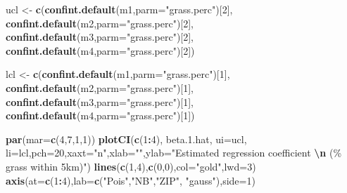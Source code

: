 \documentclass[
]{book}
\newenvironment{Shaded}{\begin{snugshade}}{\end{snugshade}}
\newcommand{\AttributeTok}[1]{\textcolor[rgb]{0.13,0.29,0.53}{#1}}
\newcommand{\DecValTok}[1]{\textcolor[rgb]{0.00,0.00,0.81}{#1}}
\newcommand{\FloatTok}[1]{\textcolor[rgb]{0.00,0.00,0.81}{#1}}
\newcommand{\FunctionTok}[1]{\textcolor[rgb]{0.13,0.29,0.53}{\textbf{#1}}}
\newcommand{\NormalTok}[1]{#1}
\newcommand{\OtherTok}[1]{\textcolor[rgb]{0.56,0.35,0.01}{#1}}
\newcommand{\SpecialCharTok}[1]{\textcolor[rgb]{0.81,0.36,0.00}{\textbf{#1}}}
\newcommand{\StringTok}[1]{\textcolor[rgb]{0.31,0.60,0.02}{#1}}
\begin{document}
\begin{Shaded}
\begin{Highlighting}[]
\NormalTok{ucl }\OtherTok{\textless{}{-}} \FunctionTok{c}\NormalTok{(}\FunctionTok{confint.default}\NormalTok{(m1,}\AttributeTok{parm=}\StringTok{"grass.perc"}\NormalTok{)[}\DecValTok{2}\NormalTok{],}
         \FunctionTok{confint.default}\NormalTok{(m2,}\AttributeTok{parm=}\StringTok{"grass.perc"}\NormalTok{)[}\DecValTok{2}\NormalTok{],}
         \FunctionTok{confint.default}\NormalTok{(m3,}\AttributeTok{parm=}\StringTok{"grass.perc"}\NormalTok{)[}\DecValTok{2}\NormalTok{],}
         \FunctionTok{confint.default}\NormalTok{(m4,}\AttributeTok{parm=}\StringTok{"grass.perc"}\NormalTok{)[}\DecValTok{2}\NormalTok{])}

\NormalTok{lcl }\OtherTok{\textless{}{-}} \FunctionTok{c}\NormalTok{(}\FunctionTok{confint.default}\NormalTok{(m1,}\AttributeTok{parm=}\StringTok{"grass.perc"}\NormalTok{)[}\DecValTok{1}\NormalTok{],}
         \FunctionTok{confint.default}\NormalTok{(m2,}\AttributeTok{parm=}\StringTok{"grass.perc"}\NormalTok{)[}\DecValTok{1}\NormalTok{],}
         \FunctionTok{confint.default}\NormalTok{(m3,}\AttributeTok{parm=}\StringTok{"grass.perc"}\NormalTok{)[}\DecValTok{1}\NormalTok{],}
         \FunctionTok{confint.default}\NormalTok{(m4,}\AttributeTok{parm=}\StringTok{"grass.perc"}\NormalTok{)[}\DecValTok{1}\NormalTok{])}

\FunctionTok{par}\NormalTok{(}\AttributeTok{mar=}\FunctionTok{c}\NormalTok{(}\DecValTok{4}\NormalTok{,}\DecValTok{7}\NormalTok{,}\DecValTok{1}\NormalTok{,}\DecValTok{1}\NormalTok{))}
\FunctionTok{plotCI}\NormalTok{(}\FunctionTok{c}\NormalTok{(}\DecValTok{1}\SpecialCharTok{:}\DecValTok{4}\NormalTok{), beta.}\FloatTok{1.}\NormalTok{hat, }\AttributeTok{ui=}\NormalTok{ucl, }\AttributeTok{li=}\NormalTok{lcl,}\AttributeTok{pch=}\DecValTok{20}\NormalTok{,}\AttributeTok{xaxt=}\StringTok{"n"}\NormalTok{,}\AttributeTok{xlab=}\StringTok{""}\NormalTok{,}\AttributeTok{ylab=}\StringTok{"Estimated regression coefficient }\SpecialCharTok{\textbackslash{}n}\StringTok{ (\% grass within 5km)"}\NormalTok{)}
\FunctionTok{lines}\NormalTok{(}\FunctionTok{c}\NormalTok{(}\DecValTok{1}\NormalTok{,}\DecValTok{4}\NormalTok{),}\FunctionTok{c}\NormalTok{(}\DecValTok{0}\NormalTok{,}\DecValTok{0}\NormalTok{),}\AttributeTok{col=}\StringTok{"gold"}\NormalTok{,}\AttributeTok{lwd=}\DecValTok{3}\NormalTok{)}
\FunctionTok{axis}\NormalTok{(}\AttributeTok{at=}\FunctionTok{c}\NormalTok{(}\DecValTok{1}\SpecialCharTok{:}\DecValTok{4}\NormalTok{),}\AttributeTok{lab=}\FunctionTok{c}\NormalTok{(}\StringTok{"Pois"}\NormalTok{,}\StringTok{"NB"}\NormalTok{,}\StringTok{"ZIP"}\NormalTok{, }\StringTok{"gauss"}\NormalTok{),}\AttributeTok{side=}\DecValTok{1}\NormalTok{)}
\end{Highlighting}
\end{Shaded}
\end{document}
